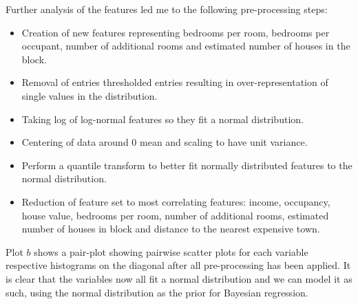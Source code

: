\documentclass[11pt]{article}
\begin{document}
Further analysis of the features led me to the following pre-processing steps:

\begin{itemize}
    \setlength\itemsep{0em}
    \item Creation of new features representing bedrooms per room, bedrooms per occupant, number of additional rooms and estimated number of houses in the block.
    \item Removal of entries thresholded entries resulting in over-representation of single values in the distribution.
    \item Taking log of log-normal features so they fit a normal distribution.
    \item Centering of data around 0 mean and scaling to have unit variance.
    \item Perform a quantile transform to better fit normally distributed features to the normal distribution.
    \item Reduction of feature set to most correlating features: income, occupancy, house value, bedrooms per room, number of additional rooms, estimated number of houses in block and distance to the nearest expensive town. 
\end{itemize}

Plot $b$ shows a pair-plot showing pairwise scatter plots for each variable respective histograms on the diagonal after all pre-processing has been applied. It is clear that the variables now all fit a normal distribution and we can model it as such, using the normal distribution as the prior for Bayesian regression.
\end{document}
